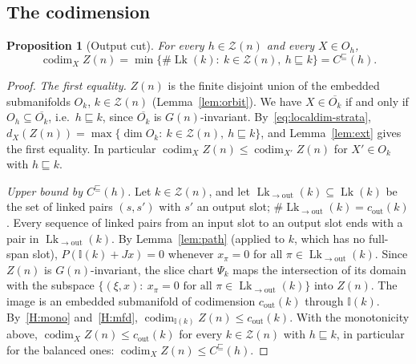 \documentclass[11pt,a4paper]{article}
\newtheorem{proposition}[theorem]{Proposition}
\theoremstyle{definition}
\theoremstyle{remark}
\numberwithin{equation}{section}
\newcommand{\codim}{\operatorname{codim}}
\newcommand{\cout}{c_{\mathrm{out}}}
\newcommand{\Zb}{\mathcal Z}
\newcommand{\I}{\mathbb I}
\newcommand{\Lk}{\operatorname{Lk}}
\begin{document}
\subsection{The codimension}
\begin{proposition}[Output cut]\label{prop:codim}
For every $h\in\Zb(n)$ and every $X\in O_h$,
\[
\codim_XZ(n)=\min\{\#\Lk(k):\ k\in\Zb(n),\ h\sqsubseteq k\}=C^\sqsubseteq(h).
\]
\end{proposition}
\begin{proof}
\emph{The first equality.} $Z(n)$ is the finite disjoint union of the embedded submanifolds $O_k$, $k\in\Zb(n)$ (Lemma~\ref{lem:orbit}). We have $X\in\overline{O_k}$ if and only if $O_h\subseteq\overline{O_k}$, i.e.\ $h\sqsubseteq k$, since $\overline{O_k}$ is $G(n)$-invariant. By~\eqref{eq:localdim-strata}, $d_X(Z(n))=\max\{\dim O_k:\ k\in\Zb(n),\ h\sqsubseteq k\}$, and Lemma~\ref{lem:ext} gives the first equality. In particular $\codim_XZ(n)\le\codim_{X'}Z(n)$ for $X'\in O_k$ with $h\sqsubseteq k$.

\emph{Upper bound by $C^\sqsubseteq(h)$.} Let $k\in\Zb(n)$, and let $\Lk_{\to\mathrm{out}}(k)\subseteq\Lk(k)$ be the set of linked pairs $(s,s')$ with $s'$ an output slot; $\#\Lk_{\to\mathrm{out}}(k)=\cout(k)$. Every sequence of linked pairs from an input slot to an output slot ends with a pair in $\Lk_{\to\mathrm{out}}(k)$. By Lemma~\ref{lem:path} (applied to $k$, which has no full-span slot), $P(\I(k)+Jx)=0$ whenever $x_\pi=0$ for all $\pi\in\Lk_{\to\mathrm{out}}(k)$. Since $Z(n)$ is $G(n)$-invariant, the slice chart $\Psi_k$ maps the intersection of its domain with the subspace $\{(\xi,x):\ x_\pi=0\text{ for all }\pi\in\Lk_{\to\mathrm{out}}(k)\}$ into $Z(n)$. The image is an embedded submanifold of codimension $\cout(k)$ through $\I(k)$. By~\ref{H:mono} and~\ref{H:mfd}, $\codim_{\I(k)}Z(n)\le\cout(k)$. With the monotonicity above, $\codim_XZ(n)\le\cout(k)$ for every $k\in\Zb(n)$ with $h\sqsubseteq k$, in particular for the balanced ones: $\codim_XZ(n)\le C^\sqsubseteq(h)$.


\end{proof}
\end{document}
